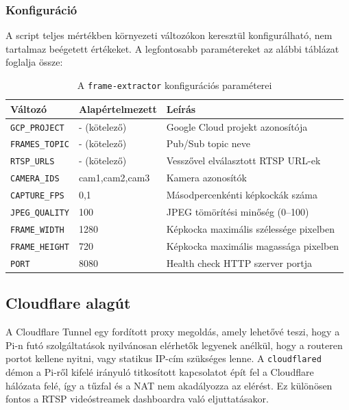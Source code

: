         \subsubsection{Konfiguráció}
        A script teljes mértékben környezeti változókon keresztül konfigurálható, nem tartalmaz beégetett értékeket.
        A legfontosabb paramétereket az alábbi táblázat foglalja össze:

        \begin{table}[H]
            \centering
            \begin{tabular}{|l|l|l|}
                \hline
                \textbf{Változó} & \textbf{Alapértelmezett} & \textbf{Leírás} \\
                \hline
                \texttt{GCP\_PROJECT}  & - (kötelező) & Google Cloud projekt azonosítója \\
                \texttt{FRAMES\_TOPIC} & - (kötelező) & Pub/Sub topic neve \\
                \texttt{RTSP\_URLS}    & - (kötelező) & Vesszővel elválasztott RTSP URL-ek \\
                \texttt{CAMERA\_IDS}   & cam1,cam2,cam3 & Kamera azonosítók \\
                \texttt{CAPTURE\_FPS}  & 0,1 & Másodpercenkénti képkockák száma \\
                \texttt{JPEG\_QUALITY} & 100 & JPEG tömörítési minőség (0–100) \\
                \texttt{FRAME\_WIDTH}  & 1280 & Képkocka maximális szélessége pixelben \\
                \texttt{FRAME\_HEIGHT} & 720 & Képkocka maximális magassága pixelben \\
                \texttt{PORT}          & 8080 & Health check HTTP szerver portja \\
                \hline
            \end{tabular}
            \caption{A \texttt{frame-extractor} konfigurációs paraméterei}
        \end{table}

        \subsection{Cloudflare alagút}
        A Cloudflare Tunnel egy fordított proxy megoldás, amely lehetővé teszi, hogy a Pi-n futó szolgáltatások nyilvánosan elérhetők legyenek
        anélkül, hogy a routeren portot kellene nyitni, vagy statikus IP-cím szükséges lenne\cite{cloudflare_tunnel}.
        A \texttt{cloudflared} démon a Pi-ről kifelé irányuló titkosított kapcsolatot épít fel a Cloudflare hálózata felé,
        így a tűzfal és a NAT nem akadályozza az elérést. Ez különösen fontos a RTSP videóstreamek dashboardra való eljuttatásakor.

